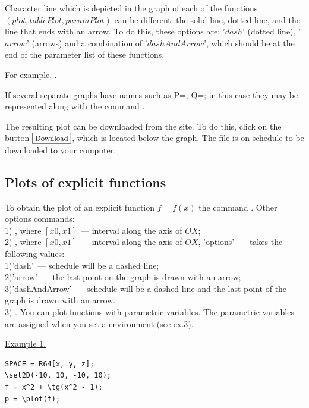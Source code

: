 Character line which is depicted in the graph of each of the functions
$(plot, tablePlot, paramPlot)$ can be different: the solid line, dotted line, and the line that ends with an arrow.
To do this, these options are: '$dash$' (dotted line), '$arrow$' (arrows) and a combination of '$dashAndArrow$', which should be at the end of 
the parameter list of these functions.

For example, .

If several separate graphs have names such as
P=; Q=; in this case they may be represented along with the command .

The resulting plot can be downloaded from the site.
To do this, click on the button $\small \fbox{Download}$, which is located below the graph. The file is on schedule to be downloaded to your computer.


\subsection{Plots of explicit functions} 
To obtain the plot of an explicit function $f=f(x)$ the command 
.
Other options commands: \\
1) , where $[x0, x1]$~--- interval along the axis of $OX$;\\
2) , where $[x0, x1]$~--- interval along the axis of $OX$, 'options'~--- takes the following values:\\
1)'dash'~--- schedule will be a dashed line;\\ 
2)'arrow'~---  the last point on the graph is drawn with an arrow;\\
3)'dashAndArrow'~--- schedule will be a dashed line and the last point of the graph is drawn with an arrow.\\
3) . 
You can plot functions with parametric variables. The parametric variables are assigned when you set a environment (see ex.3). 

\underline{Example 1. }
\vspace*{-2mm}
\begin{verbatim}
SPACE = R64[x, y, z];
\set2D(-10, 10, -10, 10);
f = x^2 + \tg(x^2 - 1); 
p = \plot(f);
\end{verbatim}
\vspace*{-2mm}



